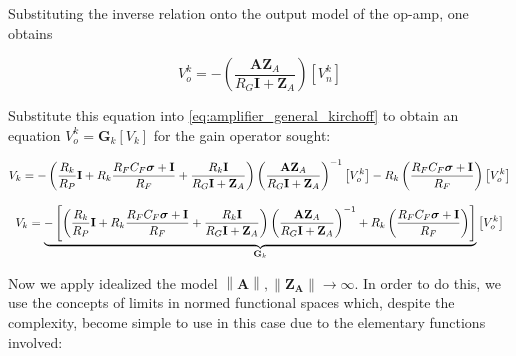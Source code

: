 	Substituting the inverse relation onto the output model of the op-amp, one obtains

\begin{equation} V_o^k = -\left(\dfrac{\mathbf{A}\mathbf{Z}_A}{R_G\mathbf{I} + \mathbf{Z}_A}\right) \left[V_n^k\right] \label{eq:vpi_vi} \end{equation}

	Substitute this equation into \eqref{eq:amplifier_general_kirchoff} to obtain an equation $V_o^k = \mathbf{G}_k \left[V_k\right]$ for the gain operator sought:

\begin{gather}
	V_k = -\left(\dfrac{R_k}{R_P}\mathbf{I} + R_k\dfrac{R_FC_F \boldsymbol{\sigma} + \mathbf{I}}{R_F} + \dfrac{R_k\mathbf{I}}{R_G\mathbf{I} + \mathbf{Z}_A}\right)\left(\dfrac{\mathbf{A}\mathbf{Z}_A}{R_G\mathbf{I} + \mathbf{Z}_A}\right)^{-1} \left[V_o^k \right] - R_k\left(\dfrac{R_FC_F \boldsymbol{\sigma} + \mathbf{I}}{R_F}\right) \left[V_o^k \right] \nonumber\\[3mm]
	V_k = \underbrace{-\left[\left(\dfrac{R_k}{R_P}\mathbf{I} + R_k\dfrac{R_FC_F \boldsymbol{\sigma} + \mathbf{I}}{R_F} + \dfrac{R_k\mathbf{I}}{R_G\mathbf{I} + \mathbf{Z}_A}\right)\left(\dfrac{\mathbf{A}\mathbf{Z}_A}{R_G\mathbf{I} + \mathbf{Z}_A}\right)^{-1} + R_k\left(\dfrac{R_FC_F \boldsymbol{\sigma} + \mathbf{I}}{R_F}\right)\right] }_{\mathbf{G}_k} \left[V_o^k \right]  \label{eq:total_gain_gi}
\end{gather} 

	Now we apply idealized the model $\left\lVert\mathbf{A}\right\rVert,\left\lVert\mathbf{Z_A}\right\rVert\to\infty $. In order to do this, we use the concepts of limits in normed functional spaces which, despite the complexity, become simple to use in this case due to the elementary functions involved:


